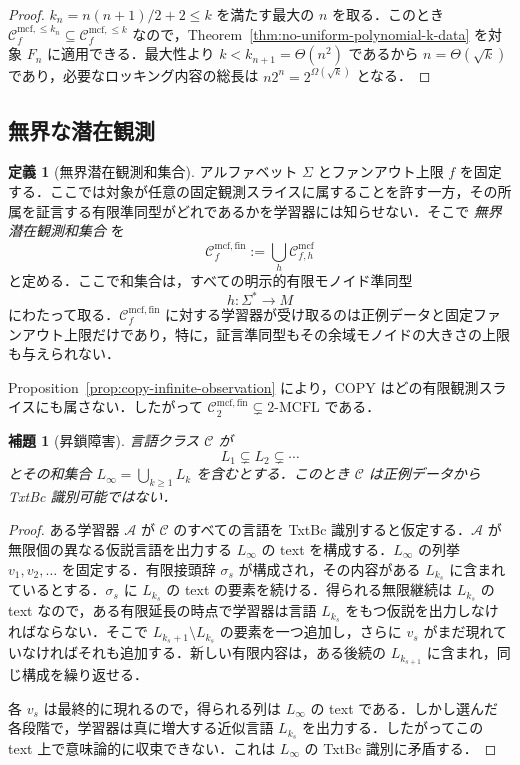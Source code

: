 \documentclass[11pt,a4paper]{ltjsarticle}
\numberwithin{equation}{section}
\theoremstyle{plain}
\newtheorem{lemma}[theorem]{補題}
\theoremstyle{definition}
\newtheorem{definition}[theorem]{定義}
\theoremstyle{remark}
\newcommand{\Cmcf}[2]{\mathcal{C}^{\mathrm{mcf}}_{#1,#2}}
\newcommand{\Clatent}[2]{\mathcal{C}^{\mathrm{mcf},\le #2}_{#1}}
\newcommand{\Callobs}[1]{\mathcal{C}^{\mathrm{mcf},\mathrm{fin}}_{#1}}
\begin{document}
\begin{proof}
\(k_n=n(n+1)/2+2\le k\) を満たす最大の \(n\) を取る．このとき
\(\Clatent{f}{k_n}\subseteq\Clatent{f}{k}\) なので，Theorem~\ref{thm:no-uniform-polynomial-k-data} を対象 \(F_n\) に適用できる．最大性より \(k<k_{n+1}=\Theta(n^2)\) であるから \(n=\Theta(\sqrt{k})\) であり，必要なロッキング内容の総長は
\(n2^n=2^{\Omega(\sqrt{k})}\) となる．
\end{proof}


\subsection{無界な潜在観測}
\begin{definition}[無界潜在観測和集合]
\label{def:no-advice-union}
アルファベット \(\Sigma\) とファンアウト上限 \(f\) を固定する．ここでは対象が任意の固定観測スライスに属することを許す一方，その所属を証言する有限準同型がどれであるかを学習器には知らせない．そこで \emph{無界潜在観測和集合} を
\[
  \Callobs{f}
  :=
  \bigcup_h \Cmcf{f}{h}
\]
と定める．ここで和集合は，すべての明示的有限モノイド準同型
\[
  h:\Sigma^*\to M
\]
にわたって取る．\(\Callobs{f}\) に対する学習器が受け取るのは正例データと固定ファンアウト上限だけであり，特に，証言準同型もその余域モノイドの大きさの上限も与えられない．
\end{definition}

Proposition~\ref{prop:copy-infinite-observation} により，COPY はどの有限観測スライスにも属さない．したがって
\(\Callobs{2}\subsetneq2\text{-}\mathrm{MCFL}\) である．

\begin{lemma}[昇鎖障害]
\label{lem:ascending-chain-obstruction}
言語クラス \(\mathcal C\) が
\[
  L_1\subsetneq L_2\subsetneq\cdots
\]
とその和集合 \(L_\infty=\bigcup_{k\ge1}L_k\) を含むとする．このとき \(\mathcal C\) は正例データから TxtBc 識別可能ではない．
\end{lemma}

\begin{proof}
ある学習器 \(\mathcal A\) が \(\mathcal C\) のすべての言語を TxtBc 識別すると仮定する．\(\mathcal A\) が無限個の異なる仮説言語を出力する \(L_\infty\) の text を構成する．\(L_\infty\) の列挙 \(v_1,v_2,\ldots\) を固定する．有限接頭辞 \(\sigma_s\) が構成され，その内容がある \(L_{k_s}\) に含まれているとする．\(\sigma_s\) に \(L_{k_s}\) の text の要素を続ける．得られる無限継続は \(L_{k_s}\) の text なので，ある有限延長の時点で学習器は言語 \(L_{k_s}\) をもつ仮説を出力しなければならない．そこで \(L_{k_s+1}\setminus L_{k_s}\) の要素を一つ追加し，さらに \(v_s\) がまだ現れていなければそれも追加する．新しい有限内容は，ある後続の \(L_{k_{s+1}}\) に含まれ，同じ構成を繰り返せる．

各 \(v_s\) は最終的に現れるので，得られる列は \(L_\infty\) の text である．しかし選んだ各段階で，学習器は真に増大する近似言語 \(L_{k_s}\) を出力する．したがってこの text 上で意味論的に収束できない．これは \(L_\infty\) の TxtBc 識別に矛盾する．
\end{proof}
\end{document}
